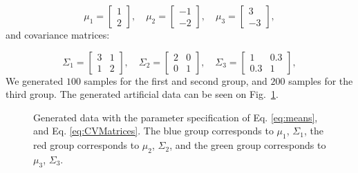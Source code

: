 \documentclass[letterpaper, 10 pt, conference]{ieeeconf}  %
\begin{document}
\begin{equation}
\mu_{1} = \begin{bmatrix}1 \\ 2\end{bmatrix}, \quad \mu_{2} = \begin{bmatrix}-1 \\ -2\end{bmatrix},  \quad  \mu_{3} = \begin{bmatrix}3 \\ -3\end{bmatrix},
\label{eq:means}
\end{equation} 
and covariance matrices: 

\begin{equation}
\Sigma_{1} = \begin{bmatrix} 3 & 1 \\ 1 & 2\end{bmatrix}, \quad \Sigma_{2} = \begin{bmatrix} 2 & 0 \\ 0 & 1\end{bmatrix},  \quad \Sigma_{3} = \begin{bmatrix} 1 & 0.3 \\ 0.3 & 1\end{bmatrix},
\label{eq:CVMatrices}
\end{equation} 
We generated $100$ samples for the first and second group, and $200$ samples for the third group. The generated artificial data
can be seen on Fig.~\ref{fig:data}.
          
\begin{figure}[thpb]
      \centering
      \caption{Generated data with the parameter specification of Eq. \ref{eq:means}, and Eq. \ref{eq:CVMatrices}. The blue group
      corresponds to $\mu_{1}$, $\Sigma_{1}$, the red group corresponds to  $\mu_{2}$, $\Sigma_{2}$, and the green group corresponds to  $\mu_{3}$, $\Sigma_{3}$.}
      \label{fig:data}
\end{figure}
\end{document}
